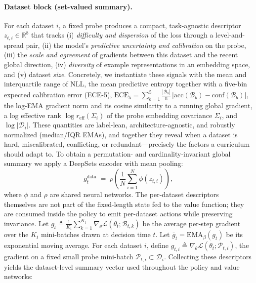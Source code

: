 \documentclass[11pt]{article}
\newcommand{\R}{\mathbb{R}}
\newcommand{\1}{\mathbf{1}}
\begin{document}
\paragraph{Dataset block (set-valued summary).}
For each dataset $i$, a fixed probe produces a compact, task-agnostic descriptor $z_{t,i}\in\R^{8}$ that tracks (i) \emph{difficulty and dispersion} of the loss through a level-and-spread pair, (ii) the model’s \emph{predictive uncertainty and calibration} on the probe, (iii) the \emph{scale and agreement} of gradients between this dataset and the recent global direction, (iv) \emph{diversity} of example representations in an embedding space, and (v) dataset \emph{size}. Concretely, we instantiate these signals with the mean and interquartile range of NLL, the mean predictive entropy together with a five-bin expected calibration error (ECE-5),
\(
\mathrm{ECE}_5=\sum_{b=1}^5 \tfrac{|\mathcal{B}_b|}{n}\,|\mathrm{acc}(\mathcal{B}_b)-\mathrm{conf}(\mathcal{B}_b)|,
\)
the log-EMA gradient norm and its cosine similarity to a running global gradient, a log effective rank $ \log r_{\mathrm{eff}}(\Sigma_i)$ of the probe embedding covariance $\Sigma_i$, and $\log|\mathcal{D}_i|$. These quantities are label-lean, architecture-agnostic, and robustly normalized (median/IQR EMAs), and together they reveal when a dataset is hard, miscalibrated, conflicting, or redundant—precisely the factors a curriculum should adapt to. To obtain a permutation- and cardinality-invariant global summary we apply a DeepSets encoder with mean pooling:
\begin{equation}
g^{\text{data}}_t \;=\; \rho\!\left(\frac{1}{N}\sum_{i=1}^N \phi(z_{t,i})\right),
\label{eq:deepsets-global}
\end{equation}
where $\phi$ and $\rho$ are shared neural networks. The per-dataset descriptors themselves are not part of the fixed-length state fed to the value function; they are consumed inside the policy to emit per-dataset actions while preserving invariance. Let \(g_t \triangleq \frac{1}{K_t}\sum_{k=1}^{K_t} \nabla_\theta \mathcal{L}(\theta_t; \mathcal{B}_{t,k})\) 
be the average per-step gradient over the \(K_t\) mini-batches drawn at decision time \(t\). 
Let \(\bar g_t = \mathrm{EMA}_\beta(g_t)\) be its exponential moving average. 
For each dataset \(i\), define \(g_{t,i} \triangleq \nabla_\theta \mathcal{L}(\theta_t; \mathcal{P}_{t,i})\), 
the gradient on a fixed small probe mini-batch \(\mathcal{P}_{t,i}\subset\mathcal{D}_i\).
Collecting these descriptors yields the dataset-level summary vector used throughout the policy and value networks:
\end{document}
